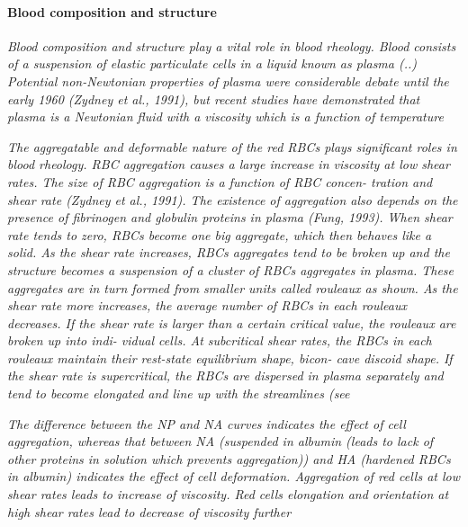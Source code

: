 \documentclass[11pt,letterpaper]{article}
\begin{document}
\paragraph{Blood composition and  structure}\textit{Blood composition  and structure play a vital role in blood  rheology. Blood consists of a suspension of  elastic particulate cells  in  a liquid known as plasma (..) Potential non-Newtonian properties of plasma  were considerable debate until the early 1960 (Zydney  et al., 1991), but  recent  studies have demonstrated  that plasma is  a Newtonian  fluid with  a viscosity which is a  function of temperature}

\textit{The aggregatable and  deformable nature of the red RBCs
plays significant roles in blood rheology. RBC aggregation causes a large increase in  viscosity at low shear rates. The size of RBC aggregation is a  function  of  RBC  concen- tration and shear rate (Zydney  et al., 1991).  The existence of aggregation also depends  on  the presence of fibrinogen and  globulin proteins in plasma (Fung,  1993). When  shear rate tends to  zero,  RBCs become  one big aggregate,  which then  behaves like  a solid. As  the shear  rate increases, RBCs aggregates  tend to be  broken  up and the  structure becomes a suspension of a  cluster of  RBCs aggregates in  plasma. These aggregates are  in turn formed  from smaller  units called rouleaux as shown. As the shear rate more  increases,  the average number of  RBCs  in each rouleaux  decreases. If the shear rate is larger than a certain  critical value,  the rouleaux are  broken up  into indi- vidual cells. At subcritical shear rates, the  RBCs  in each rouleaux maintain  their rest-state equilibrium  shape, bicon- cave discoid shape.  If the  shear rate is  supercritical, the RBCs  are dispersed in plasma separately  and tend to become  elongated  and line up with the streamlines  (see}

\textit{The  difference between the NP and NA curves indicates the effect of  cell aggregation, whereas that  between NA (suspended in albumin (leads to lack of other proteins in solution which prevents aggregation))  and HA (hardened RBCs in albumin) indicates the  effect of cell deformation. Aggregation of  red cells at low shear rates leads to  increase  of viscosity. Red cells  elongation and orientation  at high shear rates  lead to decrease of viscosity further}
\end{document}
